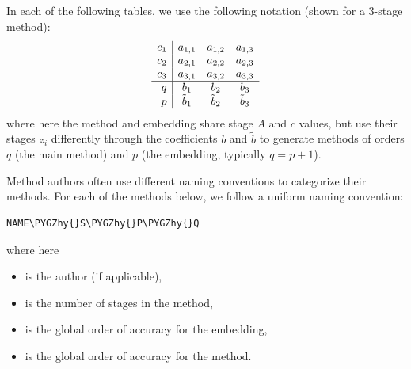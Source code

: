 \documentclass[letterpaper,10pt,english]{sphinxmanual}
\def\PYGZhy{\char`\-}
\begin{document}
In each of the following tables, we use the following notation (shown
for a 3-stage method):
\begin{gather}
\begin{split}\begin{array}{r|ccc}
  c_1 & a_{1,1} & a_{1,2} & a_{1,3} \\
  c_2 & a_{2,1} & a_{2,2} & a_{2,3} \\
  c_3 & a_{3,1} & a_{3,2} & a_{3,3} \\
  \hline
  q & b_1 & b_2 & b_3 \\
  p & \tilde{b}_1 & \tilde{b}_2 & \tilde{b}_3
\end{array}\end{split}\notag
\end{gather}
where here the method and embedding share stage \(A\) and
\(c\) values, but use their stages \(z_i\) differently through
the coefficients \(b\) and \(\tilde{b}\) to generate methods
of orders \(q\) (the main method) and \(p\) (the embedding,
typically \(q = p+1\)).

Method authors often use different naming conventions to categorize
their methods.  For each of the methods below, we follow a uniform
naming convention:

\begin{Verbatim}[commandchars=\\\{\}]
NAME\PYGZhy{}S\PYGZhy{}P\PYGZhy{}Q
\end{Verbatim}

where here
\begin{itemize}
\item {} 
 is the author (if applicable),

\item {} 
 is the number of stages in the method,

\item {} 
 is the global order of accuracy for the embedding,

\item {} 
 is the global order of accuracy for the method.

\end{itemize}
\end{document}
